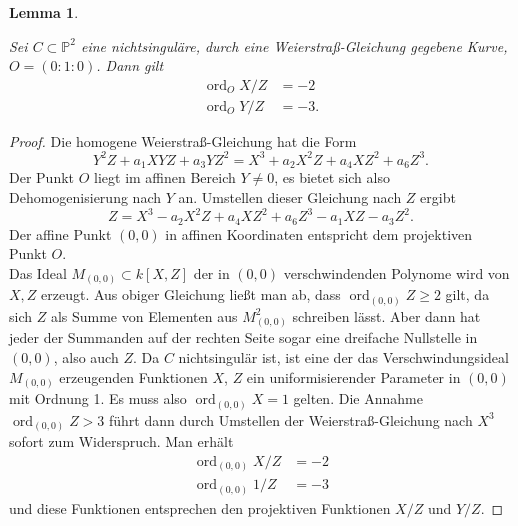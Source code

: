 \documentclass{amsart}
\theoremstyle{plain}
\newtheorem{lemma}[subsection]{Lemma}
\theoremstyle{definition}
\newcommand{\projspace}{\mathds{P}}
\newcommand{\ord}{\operatorname{ord}}
\begin{document}
\begin{lemma}
	\label{lem-polordnungen}

	Sei $C \subset \projspace^2$ eine nichtsinguläre, durch eine Weierstraß-Gleichung gegebene Kurve, $O = (0 : 1 : 0)$.
	Dann gilt 
	\begin{align*}
		\ord_O X/Z & = -2 \\
		\ord_O Y/Z & = -3.
	\end{align*}
\end{lemma}
\begin{proof}
	Die homogene Weierstraß-Gleichung hat die Form
	\begin{equation*}
		Y^2 Z + a_1 X Y Z + a_3 Y Z^2 = X^3 + a_2 X^2  Z + a_4 X Z^2 + a_6 Z^3.
	\end{equation*}
	Der Punkt $O$ liegt im affinen Bereich $Y \neq 0$, es bietet sich also Dehomogenisierung nach $Y$ an.
	Umstellen dieser Gleichung nach $Z$ ergibt
	\begin{equation*}
		Z = X^3 - a_2 X^2 Z + a_4 X Z^2 + a_6 Z^3 - a_1 X Z - a_3 Z^2.
	\end{equation*}
	Der affine Punkt $(0, 0)$ in affinen Koordinaten entspricht dem projektiven Punkt $O$. \\
	Das Ideal $M_{(0, 0)} \subset k[X, Z]$ der in $(0, 0)$ verschwindenden Polynome wird von $X, Z$ erzeugt.
	Aus obiger Gleichung ließt man ab, dass $\ord_{(0, 0)} Z \geq 2$ gilt, da sich $Z$ als Summe von Elementen aus $M_{(0, 0)}^2$ schreiben lässt.
	Aber dann hat jeder der Summanden auf der rechten Seite sogar eine dreifache Nullstelle in $(0, 0)$, also auch $Z$.
	Da $C$ nichtsingulär ist, ist eine der das Verschwindungsideal $M_{(0, 0)}$ erzeugenden Funktionen $X$, $Z$ ein uniformisierender Parameter in $(0, 0)$ mit Ordnung 1.
	Es muss also $\ord_{(0, 0)} X = 1$ gelten.
	Die Annahme $\ord_{(0, 0)} Z > 3$ führt dann durch Umstellen der Weierstraß-Gleichung nach $X^3$ sofort zum Widerspruch.
	Man erhält
	\begin{align*}
		\ord_{(0, 0)} X / Z & = -2 \\
		\ord_{(0, 0)} 1 / Z & = -3
	\end{align*}
	und diese Funktionen entsprechen den projektiven Funktionen $X / Z$ und $Y / Z$.
\end{proof}
\end{document}
